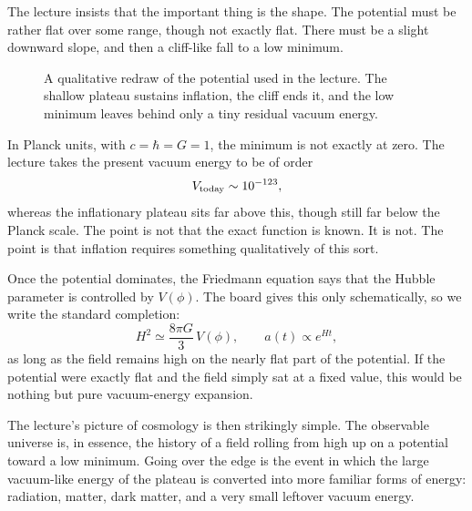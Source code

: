 The lecture insists that the important thing is the shape. The potential must be rather flat over some range, though not exactly flat. There must be a slight downward slope, and then a cliff-like fall to a low minimum.

\begin{figure}[t]
\centering
{}
\caption{A qualitative redraw of the potential used in the lecture. The shallow plateau sustains inflation, the cliff ends it, and the low minimum leaves behind only a tiny residual vacuum energy.}
\end{figure}

In Planck units, with \(c=\hbar=G=1\), the minimum is not exactly at zero. The lecture takes the present vacuum energy to be of order
\begin{equation}
V_{\rm today}\sim 10^{-123},
\end{equation}
whereas the inflationary plateau sits far above this, though still far below the Planck scale. The point is not that the exact function is known. It is not. The point is that inflation requires something qualitatively of this sort.

Once the potential dominates, the Friedmann equation says that the Hubble parameter is controlled by \(V(\phi)\). The board gives this only schematically, so we write the standard completion:
\begin{equation}
H^2\simeq \frac{8\pi G}{3}\,V(\phi),
\qquad
a(t)\propto e^{Ht},
\end{equation}
as long as the field remains high on the nearly flat part of the potential. If the potential were exactly flat and the field simply sat at a fixed value, this would be nothing but pure vacuum-energy expansion.

The lecture's picture of cosmology is then strikingly simple. The observable universe is, in essence, the history of a field rolling from high up on a potential toward a low minimum. Going over the edge is the event in which the large vacuum-like energy of the plateau is converted into more familiar forms of energy: radiation, matter, dark matter, and a very small leftover vacuum energy.


